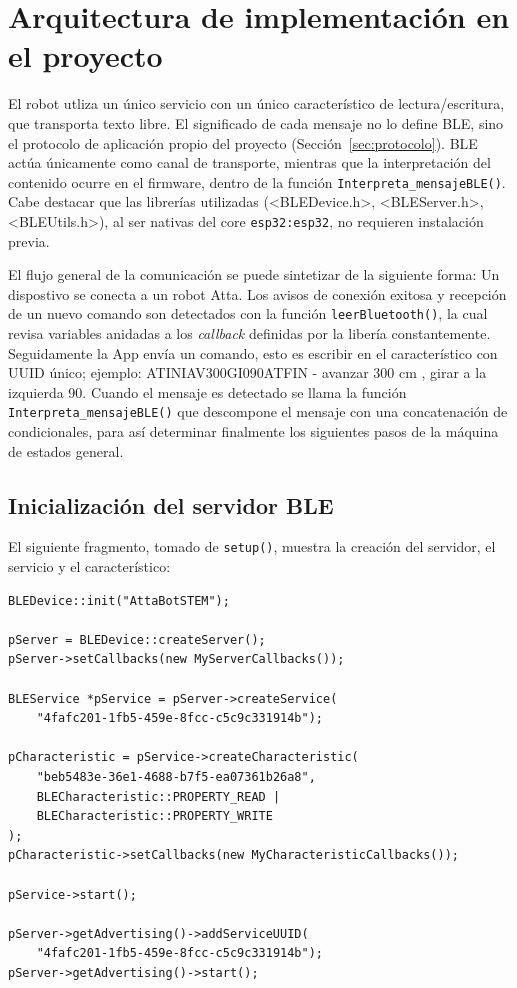 \documentclass[12pt,a4paper]{article}
\begin{document}
\section{Arquitectura de implementación en el proyecto}
\label{sec:arquitectura}

El robot utliza un único servicio con un único característico de lectura/escritura, que transporta texto libre. El significado de cada mensaje no lo define BLE, sino el protocolo de aplicación propio del proyecto (Sección~\ref{sec:protocolo}). BLE actúa únicamente como canal de transporte, mientras que la interpretación del contenido ocurre en el firmware, dentro de la función \texttt{Interpreta\_mensajeBLE()}. Cabe destacar que las librerías utilizadas (<BLEDevice.h>, <BLEServer.h>, <BLEUtils.h>), al ser nativas del core \texttt{esp32:esp32}, no requieren instalación previa. 

El flujo general de la comunicación se puede sintetizar de la siguiente forma:
Un dispostivo se conecta a un robot Atta. Los avisos de conexión exitosa y recepción de un nuevo comando son detectados con la función \texttt{leerBluetooth()}, la cual revisa variables anidadas a los \textit{callback} definidas por la libería constantemente. Seguidamente la App envía un comando, esto es escribir en el característico con UUID único; ejemplo: ATINIAV300GI090ATFIN - avanzar 300 cm , girar a la izquierda 90\degree. Cuando el mensaje es detectado se llama la función \texttt{Interpreta\_mensajeBLE()} que descompone el mensaje  con una concatenación de condicionales, para así determinar finalmente los siguientes pasos de la máquina de estados general. 

\subsection{Inicialización del servidor BLE}

El siguiente fragmento, tomado de \texttt{setup()}, muestra la creación del servidor, el servicio y el característico:

\begin{lstlisting}[caption={Inicialización BLE en \texttt{setup()}}, label={lst:setup-ble}]
BLEDevice::init("AttaBotSTEM");

pServer = BLEDevice::createServer();
pServer->setCallbacks(new MyServerCallbacks());

BLEService *pService = pServer->createService(
    "4fafc201-1fb5-459e-8fcc-c5c9c331914b");

pCharacteristic = pService->createCharacteristic(
    "beb5483e-36e1-4688-b7f5-ea07361b26a8",
    BLECharacteristic::PROPERTY_READ |
    BLECharacteristic::PROPERTY_WRITE
);
pCharacteristic->setCallbacks(new MyCharacteristicCallbacks());

pService->start();

pServer->getAdvertising()->addServiceUUID(
    "4fafc201-1fb5-459e-8fcc-c5c9c331914b");
pServer->getAdvertising()->start();
\end{lstlisting}
\end{document}

